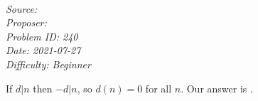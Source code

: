\SSbreak\\
\emph{Source: \Cop}\\
\emph{Proposer: \Ptroll}\\ %
\emph{Problem ID: 240}\\
\emph{Date: 2021-07-27}\\
\emph{Difficulty: Beginner}\\
\SSbreak

\bigskip

\begin{solution}\hfil\medskip
	
	If $d|n$ then $-d|n$, so $d(n) = 0$ for all $n$. Our answer is .
\end{solution}\bigskip
